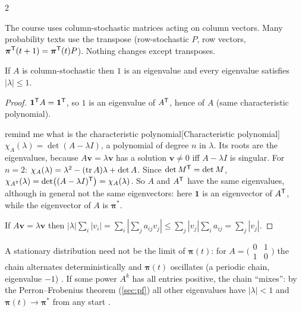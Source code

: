 \begin{paracol}{2}
\begin{coursenote}[Conventions]
The course uses column-stochastic matrices acting on column vectors. Many probability texts use the
transpose (row-stochastic $P$, row vectors, $\bm\pi^{\mathsf T}(t+1)=\bm\pi^{\mathsf T}(t)P$). Nothing changes except
transposes.
\end{coursenote}

\begin{proposition}\label{prop:stochastic}
If $A$ is column-stochastic then $1$ is an eigenvalue and every eigenvalue satisfies $|\lambda|\le1$.
\end{proposition}
\begin{proof}
$\bm 1^{\mathsf T} A=\bm 1^{\mathsf T}$, so $1$ is an eigenvalue of $A^{\mathsf T}$, hence of $A$ (same characteristic polynomial).\begin{answer}{remind me what is the characteristic polynomial}[Characteristic polynomial]
$\chi_A(\lambda)=\det(A-\lambda I)$, a polynomial of degree $n$ in $\lambda$. Its roots are the
eigenvalues, because $A\bm v=\lambda\bm v$ has a solution $\bm v\ne0$ iff $A-\lambda I$ is singular. For
$n=2$: $\chi_A(\lambda)=\lambda^2-(\operatorname{tr} A)\lambda+\det A$. Since $\det M^{\mathsf T}=\det M$,
$\chi_{A^{\mathsf T}}(\lambda)=\det\bigl((A-\lambda I)^{\mathsf T}\bigr)=\chi_A(\lambda)$. So $A$ and $A^{\mathsf T}$ have the same
eigenvalues, although in general not the same eigenvectors: here $\bm 1$ is an eigenvector of $A^{\mathsf T}$,
while the eigenvector of $A$ is $\bm\pi^*$.
\end{answer}
If $A\bm v=\lambda\bm v$ then $|\lambda|\sum_i|v_i| = \sum_i|\sum_j a_{ij}v_j|\le\sum_j|v_j|\sum_i a_{ij}
= \sum_j|v_j|$.
\end{proof}

A stationary distribution need not be the limit of $\bm\pi(t)$: for $A=\bigl(\begin{smallmatrix}0&1\\1&0\end{smallmatrix}\bigr)$
the chain alternates deterministically and $\bm\pi(t)$ oscillates (a periodic chain, eigenvalue $-1$)
. If some power $A^k$ has all entries positive, the chain ``mixes'': by the
Perron--Frobenius theorem (\cref{sec:pf}) all other eigenvalues have $|\lambda|<1$ and
$\bm\pi(t)\to\bm\pi^*$ from any start .


\end{paracol}
